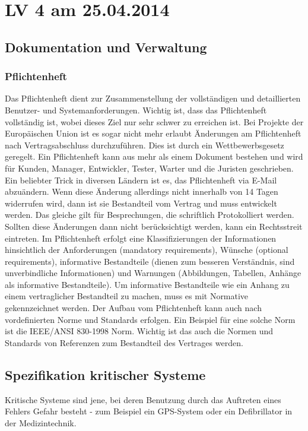 \chapter{LV 4 am 25.04.2014}
\section{Dokumentation und Verwaltung}
\subsection{Pflichtenheft}
Das Pflichtenheft dient zur Zusammenstellung der vollständigen und detaillierten Benutzer- und Systemanforderungen. Wichtig ist, dass das Pflichtenheft vollständig ist, wobei dieses Ziel nur sehr schwer zu erreichen ist. Bei Projekte der Europäischen Union ist es sogar nicht mehr erlaubt Änderungen am Pflichtenheft nach Vertragsabschluss durchzuführen. Dies ist durch ein Wettbewerbsgesetz geregelt. 
\linebreak 
Ein Pflichtenheft kann aus mehr als einem Dokument bestehen und wird  für  Kunden, Manager, Entwickler, Tester, Warter und die Juristen geschrieben. 
\linebreak
Ein beliebter Trick in diversen Ländern ist es, das Pflichtenheft via E-Mail abzuändern. Wenn diese Änderung allerdings nicht innerhalb von 14 Tagen widerrufen wird, dann ist sie Bestandteil vom Vertrag und muss entwickelt werden. Das gleiche gilt für Besprechungen, die schriftlich Protokolliert werden. Sollten diese Änderungen dann nicht berücksichtigt werden, kann ein Rechtsstreit eintreten.
\linebreak
Im Pflichtenheft erfolgt eine Klassifizierungen der Informationen hinsichtlich der Anforderungen (mandatory requirements), Wünsche (optional requirements), informative Bestandteile (dienen zum besseren Verständnis, sind unverbindliche Informationen) und Warnungen (Abbildungen, Tabellen, Anhänge als informative Bestandteile). Um informative Bestandteile wie ein Anhang zu einem vertraglicher Bestandteil zu machen, muss es mit Normative gekennzeichnet werden.
\linebreak
Der Aufbau vom Pflichtenheft kann auch nach vordefinierten Norme und Standards erfolgen. Ein Beispiel für eine solche Norm ist die IEEE/ANSI 830-1998 Norm. Wichtig ist das auch die Normen und Standards von Referenzen zum Bestandteil des Vertrages werden.

\section{Spezifikation kritischer Systeme}
Kritische Systeme sind jene, bei deren Benutzung durch das Auftreten eines Fehlers Gefahr besteht - zum Beispiel ein GPS-System oder ein Defibrillator in der Medizintechnik.

